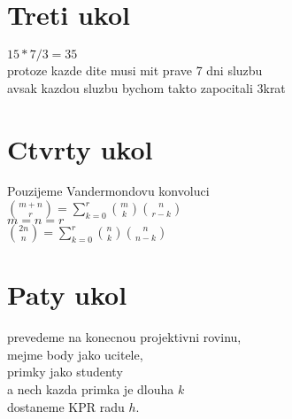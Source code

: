\documentclass[a4paper]{article}
\begin{document}
\section*{Treti ukol}
$15*7/3 = 35$\\
protoze kazde dite musi mit prave 7 dni sluzbu\\
avsak kazdou sluzbu bychom takto zapocitali 3krat




\section*{Ctvrty ukol}
Pouzijeme Vandermondovu konvoluci\\
$
\binom{m+n}{r}=\sum^r_{k=0}\binom{m}{k}\binom{n}{r-k}
$\\
$m=n=r$\\
$
\binom{2n}{n}=\sum^r_{k=0}\binom{n}{k}\binom{n}{n-k}
$\\





\section*{Paty ukol}
prevedeme na konecnou projektivni rovinu,\\
mejme body jako ucitele,\\
primky jako studenty\\
a nech kazda primka je dlouha $k$\\
dostaneme KPR radu $h$.
\end{document}
